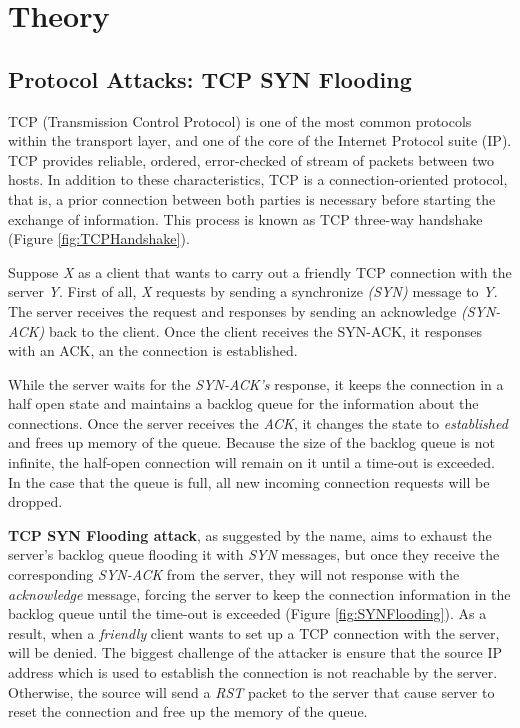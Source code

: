 


\chapter{Theory}
\label{chapter:theory}

\section{Protocol Attacks: TCP SYN Flooding}

TCP (Transmission Control Protocol) is one of the most common protocols within the transport layer, and one of the core of the Internet Protocol suite (IP). TCP provides reliable, ordered, error-checked of stream of packets between two hosts. In addition to these characteristics, TCP is a connection-oriented protocol, that is, a prior connection between both parties is necessary before starting the exchange of information. This process is known as TCP three-way handshake (Figure \ref{fig:TCPHandshake}).

\par

Suppose \textit{X} as a client that wants to carry out a friendly TCP connection with the server \textit{Y}. First of all, \textit{X} requests by sending a synchronize \textit{(SYN)} message to \textit{Y}. The server receives the request and responses by sending an acknowledge \textit{(SYN-ACK)} back to the client. Once the client receives the SYN-ACK, it responses with an ACK, an the connection is established. 

\par

While the server waits for the \textit{SYN-ACK's} response, it keeps the connection in a half open state and maintains a backlog queue for the information about the connections. Once the server receives the \textit{ACK}, it changes the state to \textit{established} and frees up memory of the queue. Because the size of the backlog queue is not infinite, the half-open connection will remain on it until a time-out is exceeded. In the case that the queue is full, all new incoming connection requests will be dropped.

\bigskip

\textbf{TCP SYN Flooding attack}, as suggested by the name, aims to exhaust the server's backlog queue flooding it with \textit{SYN} messages, but once they receive the corresponding \textit{SYN-ACK} from the server, they will not response with the \textit{acknowledge} message, forcing the server to keep the connection information in the backlog queue until the time-out is exceeded (Figure \ref{fig:SYNFlooding}). As a result, when a \textit{friendly} client wants to set up a TCP connection with the server, will be denied. The biggest challenge of the attacker is ensure that the source IP address which is used to establish the connection is not reachable by the server. Otherwise, the source will send a \textit{RST} packet to the server that cause server to reset the connection and free up the memory of the queue.


